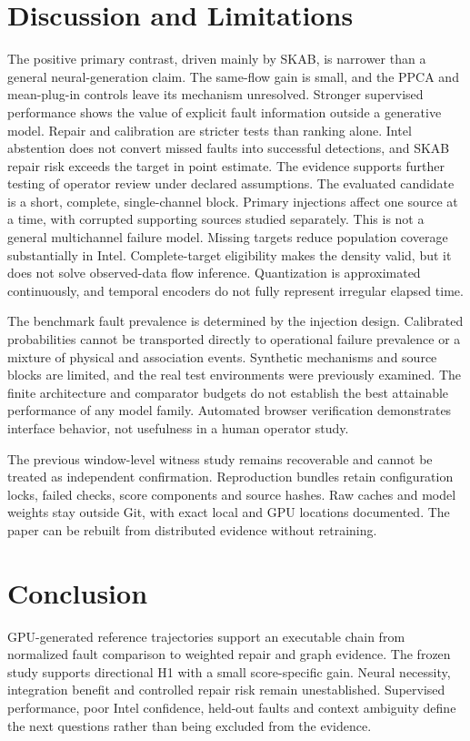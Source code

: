 \documentclass[conference]{IEEEtran}
\newcommand{\1}{\mathbf{1}}
\begin{document}
\section{Discussion and Limitations}
The positive primary contrast, driven mainly by SKAB, is narrower than a general neural-generation claim. The same-flow gain is small, and the PPCA and mean-plug-in controls leave its mechanism unresolved. Stronger supervised performance shows the value of explicit fault information outside a generative model. Repair and calibration are stricter tests than ranking alone. Intel abstention does not convert missed faults into successful detections, and SKAB repair risk exceeds the target in point estimate. The evidence supports further testing of operator review under declared assumptions.
The evaluated candidate is a short, complete, single-channel block. Primary injections affect one source at a time, with corrupted supporting sources studied separately. This is not a general multichannel failure model. Missing targets reduce population coverage substantially in Intel. Complete-target eligibility makes the density valid, but it does not solve observed-data flow inference. Quantization is approximated continuously, and temporal encoders do not fully represent irregular elapsed time.

The benchmark fault prevalence is determined by the injection design. Calibrated probabilities cannot be transported directly to operational failure prevalence or a mixture of physical and association events. Synthetic mechanisms and source blocks are limited, and the real test environments were previously examined. The finite architecture and comparator budgets do not establish the best attainable performance of any model family. Automated browser verification demonstrates interface behavior, not usefulness in a human operator study.

The previous window-level witness study remains recoverable and cannot be treated as independent confirmation. Reproduction bundles retain configuration locks, failed checks, score components and source hashes. Raw caches and model weights stay outside Git, with exact local and GPU locations documented. The paper can be rebuilt from distributed evidence without retraining.

\section{Conclusion}
GPU-generated reference trajectories support an executable chain from normalized fault comparison to weighted repair and graph evidence. The frozen study supports directional H1 with a small score-specific gain. Neural necessity, integration benefit and controlled repair risk remain unestablished. Supervised performance, poor Intel confidence, held-out faults and context ambiguity define the next questions rather than being excluded from the evidence.
\end{document}
